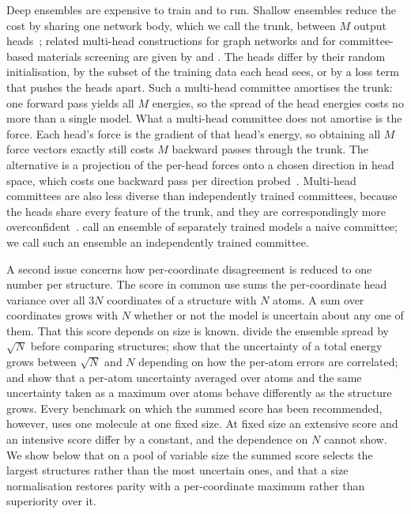 Deep ensembles are expensive to train and to run. Shallow ensembles reduce
the cost by sharing one network body, which we call the trunk, between $M$
output heads~\citep{kellner2024shallow,schafer2026shallow,vinchurkar2025gnn};
related multi-head constructions for graph networks and for committee-based
materials screening are given by \citet{carrete2023deep} and
\citet{beck2025committee}. The heads differ by their random initialisation, by
the subset of the training data each head sees, or by a loss term that pushes
the heads apart. Such a multi-head committee amortises the trunk: one forward
pass yields all $M$ energies, so the spread of the head energies costs no more
than a single model. What a multi-head committee does not amortise is the
force. Each head's force is the gradient of that head's energy, so obtaining
all $M$ force vectors exactly still costs $M$ backward passes through the
trunk. The alternative is a projection of the per-head forces onto a chosen
direction in head space, which costs one backward pass per direction
probed~\citep{beck2025committee}. Multi-head committees are also less diverse
than independently trained committees, because the heads share every feature
of the trunk, and they are correspondingly more
overconfident~\citep{kellner2024shallow,beck2025committee}. \citet{beck2025committee}
call an ensemble of separately trained models a naive committee; we call such an
ensemble an independently trained committee.

A second issue concerns how per-coordinate disagreement is reduced to one
number per structure. The score in common use sums the per-coordinate head
variance over all $3N$ coordinates of a structure with $N$ atoms. A sum over
coordinates grows with $N$ whether or not the model is uncertain about any one
of them. That this score depends on size is known. \citet{smith2018less} divide
the ensemble spread by $\sqrt{N}$ before comparing structures;
\citet{kellner2024shallow} show that the uncertainty of a total energy grows
between $\sqrt{N}$ and $N$ depending on how the per-atom errors are correlated;
and \citet{lortaraprasert2026size} show that a per-atom uncertainty averaged
over atoms and the same uncertainty taken as a maximum over atoms behave
differently as the structure grows. Every benchmark on which the summed score
has been recommended, however, uses one molecule at one fixed size. At fixed
size an extensive score and an intensive score differ by a constant, and the
dependence on $N$ cannot show. We show below that on a pool of variable size
the summed score selects the largest structures rather than the most uncertain
ones, and that a size normalisation restores parity with a per-coordinate
maximum rather than superiority over it.

